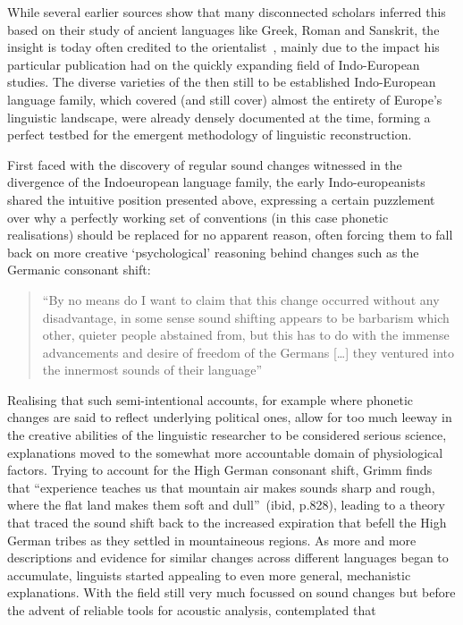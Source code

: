 While several earlier sources show that many disconnected scholars inferred this based on their study of ancient languages like Greek, Roman and Sanskrit,
the insight is today often credited to the orientalist~\citet[Sir William][]{Jones1799}, mainly due to the impact his particular publication had on the quickly expanding field of Indo-European studies. The diverse varieties of the then still to be established Indo-European language family, which covered (and still cover) almost the entirety of Europe's linguistic landscape, were already densely documented at the time, forming a perfect testbed for the emergent methodology of linguistic reconstruction.


First faced with the discovery of regular sound changes witnessed in the divergence of the Indoeuropean language family, the early Indo-europeanists shared the intuitive position presented above, expressing a certain puzzlement over why a perfectly working set of conventions (in this case phonetic realisations) should be replaced for no apparent reason, often forcing them to fall back on more creative `psychological' reasoning behind changes such as the Germanic consonant shift:

\begin{quote}
``By no means do I want to claim that this change occurred without any disadvantage, in some sense sound shifting appears to be barbarism which other, quieter people abstained from, but this has to do with the immense advancements and desire of freedom of the Germans [\ldots] they ventured into the innermost sounds of their language''~\citep[p.417, own translation]{Grimm1848}
\end{quote}

Realising that such semi-intentional accounts, for example where phonetic changes are said to reflect underlying political ones, allow for too much leeway in the creative abilities of the linguistic researcher to be considered serious science, explanations moved to the somewhat more accountable domain of physiological factors. Trying to account for the High German consonant shift, Grimm finds that ``experience teaches us that mountain air makes sounds sharp and rough, where the flat land makes them soft and dull''~(ibid, p.828), leading to a theory that traced the sound shift back to the increased expiration that befell the High German tribes as they settled in mountaineous regions. As more and more descriptions and evidence for similar changes across different languages began to accumulate, linguists started appealing to even more general, mechanistic explanations.
With the field still very much focussed on sound changes but before the advent of reliable tools for acoustic analysis, \citet{Jespersen1922} contemplated that

